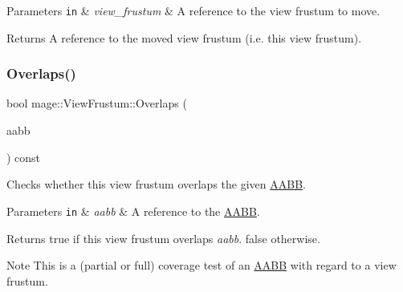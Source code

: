 \begin{DoxyParams}[1]{Parameters}
\mbox{\tt in}  & {\em view\+\_\+frustum} & A reference to the view frustum to move. \\
\hline
\end{DoxyParams}
\begin{DoxyReturn}{Returns}
A reference to the moved view frustum (i.\+e. this view frustum). 
\end{DoxyReturn}
\hypertarget{structmage_1_1_view_frustum_a35c0afb66692cfd26a0e9bee2065892e}{}\label{structmage_1_1_view_frustum_a35c0afb66692cfd26a0e9bee2065892e} 
\subsubsection{\texorpdfstring{Overlaps()}{Overlaps()}\hspace{0.1cm}{\footnotesize\ttfamily [1/2]}}
{\footnotesize\ttfamily bool mage\+::\+View\+Frustum\+::\+Overlaps (\begin{DoxyParamCaption}\item[{const \hyperlink{structmage_1_1_a_a_b_b}{A\+A\+BB} \&}]{aabb }\end{DoxyParamCaption}) const\hspace{0.3cm}{\ttfamily [noexcept]}}

Checks whether this view frustum overlaps the given \hyperlink{structmage_1_1_a_a_b_b}{A\+A\+BB}.


\begin{DoxyParams}[1]{Parameters}
\mbox{\tt in}  & {\em aabb} & A reference to the \hyperlink{structmage_1_1_a_a_b_b}{A\+A\+BB}. \\
\hline
\end{DoxyParams}
\begin{DoxyReturn}{Returns}
{\ttfamily true} if this view frustum overlaps {\itshape aabb}. {\ttfamily false} otherwise. 
\end{DoxyReturn}
\begin{DoxyNote}{Note}
This is a (partial or full) coverage test of an \hyperlink{structmage_1_1_a_a_b_b}{A\+A\+BB} with regard to a view frustum. 
\end{DoxyNote}
\hypertarget{structmage_1_1_view_frustum_ad7b492eaad1a93e650a8477045d5c0cb}{}\label{structmage_1_1_view_frustum_ad7b492eaad1a93e650a8477045d5c0cb} 
